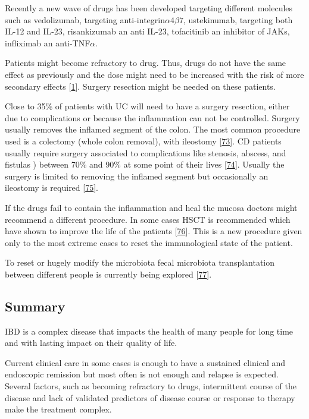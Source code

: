 \documentclass[
  a4paper,
]{book}
\begin{document}
Recently a new wave of drugs has been developed targeting different molecules such as vedolizumab, targeting anti-integrin\(\alpha 4 \beta 7\), ustekinumab, targeting both IL-12 and IL-23, risankizumab an anti IL-23, tofacitinib an inhibitor of JAKs, infliximab an anti-TNF\(\alpha\).

Patients might become refractory to drug.
Thus, drugs do not have the same effect as previously and the dose might need to be increased with the risk of more secondary effects {[}\protect\hyperlink{ref-raine2021}{1}{]}.
Surgery resection might be needed on these patients.

Close to 35\% of patients with UC will need to have a surgery resection, either due to complications or because the inflammation can not be controlled.
Surgery usually removes the inflamed segment of the colon.
The most common procedure used is a colectomy (whole colon removal), with ileostomy {[}\protect\hyperlink{ref-hwang2008}{73}{]}.
CD patients usually require surgery associated to complications like stenosis, abscess, and fistulas ) between 70\% and 90\% at some point of their lives {[}\protect\hyperlink{ref-gardiner2007}{74}{]}.
Usually the surgery is limited to removing the inflamed segment but occasionally an ileostomy is required {[}\protect\hyperlink{ref-lewis2010}{75}{]}.

If the drugs fail to contain the inflammation and heal the mucosa doctors might recommend a different procedure.
In some cases HSCT is recommended which have shown to improve the life of the patients {[}\protect\hyperlink{ref-corralizab}{76}{]}.
This is a new procedure given only to the most extreme cases to reset the immunological state of the patient.

To reset or hugely modify the microbiota fecal microbiota transplantation between different people is currently being explored {[}\protect\hyperlink{ref-weingarden2017}{77}{]}.

\hypertarget{summary-ibd}{%
\subsection{Summary}\label{summary-ibd}}

IBD is a complex disease that impacts the health of many people for long time and with lasting impact on their quality of life.

Current clinical care in some cases is enough to have a sustained clinical and endoscopic remission but most often is not enough and relapse is expected.
Several factors, such as becoming refractory to drugs, intermittent course of the disease and lack of validated predictors of disease course or response to therapy make the treatment complex.
\end{document}

